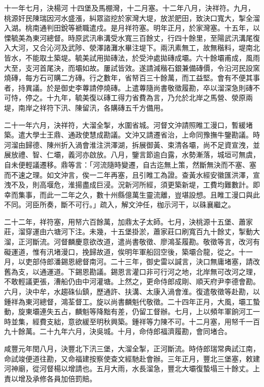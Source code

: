 \begin{pinyinscope}
十一年七月，決楊河十四堡及馬棚灣，十二月塞。十二年八月，決祥符。九月，桃源奸民陳瑞因河水盛漲，糾眾盜挖於家灣大堤，放淤肥田，致決口寬大，掣全溜入湖。桃南通判田銳等褫職遣戍。是月祥符塞。明年正月，於家灣塞。十五年，以慄毓美為東河總督。時原武汛串溝受水寬三百餘丈，行四十餘里，至陽武汛溝尾復入大河，又合沁河及武陟、滎澤諸灘水畢注堤下。兩汛素無工，故無稭料，堤南北皆水，不能取土築堤。毓美試用拋磚法，於受沖處拋磚成壩。六十餘壩甫成，風雨大至，支河首尾決，而壩如故。屢試皆效。遂請減稭石銀兼備磚價，令沿河民設窯燒磚，每方石可購二方磚。行之數年，省帑百三十餘萬，而工益堅。會有不便其事者，持異議。於是御史李蓴請停燒磚。上遣蓴隨尚書敬徵履勘，卒以溜深急則磚不可恃，停之。十九年，毓美復以磚工得力省費為言，乃允於北岸之馬營、滎原兩堤，南岸之祥符下汛、陳留汛，各購磚五千方備用。

二十一年六月，決祥符，大溜全掣，水圍省城。河督文沖請照睢工漫口，暫緩堵築。遣大學士王鼎、通政使慧成勘議。文沖又請遷省治，上命同豫撫牛鑒勘議。時河溜由歸德、陳州折入渦會淮注洪澤湖，拆展御黃、束清各壩，尚不足資宣洩，並展放禮、智、仁壩，義河亦啟放。八月，鑒言節逾白露，水勢漸落，城垣可無虞，自未便輕議遷移。鼎等言：「河流隨時變遷，自古迄無上策，然斷無決而不塞、塞而不速之理。如文沖言，俟一二年再塞，且引睢工為證。查黃水經安徽匯洪澤，宣洩不及，則高堰危，淮揚盡成巨浸。況新河所經，須更築新堤，工費均難數計。即幸而集事，而此一二年之久，數十州縣億萬生靈流離，豈堪設想。且睢工漫口與此不同。河臣所奏，斷不可行。」疏入，解文沖任，枷示河干，以硃襄繼之。

二十二年，祥符塞，用帑六百餘萬，加鼎太子太師。七月，決桃源十五堡、蕭家莊，溜穿運由六塘河下注。未幾，十五堡掛淤，蕭家莊口刷寬百九十餘丈，掣動大溜，正河斷流。河督麟慶意欲改道，遣尚書敬徵、廖鴻荃履勘。敬徵等言，改河有礙運道，惟有汛堵漫口，挽歸故道，俟明年軍船回空後，築壩合龍，從之。十一月，以吏部侍郎潘錫恩總督南河。二十三年，御史雷以諴言，決口無庸堵塞，請改舊為支，以通運道。下錫恩勘議。錫恩言灌口非可行河之地，北岸無可改河之理，不敢輕議更張，漕船仍由中河灌塘。上然之，更命侍郎成剛、順天府尹李德會勘。六月，決中牟，水趨硃仙鎮，歷通許、扶溝、太康入渦會淮。復遣敬徵等赴勘，以鍾祥為東河總督，鴻荃督工。旋以尚書麟魁代敬徵。二十四年正月，大風，壩工蟄動，旋東壩連失五占，麟魁等降黜有差，仍留工督辦。七月，上以頻年軍餉河工一時並集，經費支絀，意欲緩至明秋興築。鍾祥等力陳不可。十二月塞，用帑千一百九十餘萬。二十九年六月，決吳城。十月，命侍郎福濟履勘，會同堵合。

咸豐元年閏八月，決豐北下汛三堡，大溜全掣，正河斷流。時侍郎瑞常典試江南，命試竣便道往勘，又命福建按察使查文經馳赴會辦。三年正月，豐北三堡塞，敕建河神廟，從河督楊以增請也。五月大雨，水長溜急，豐北大壩復蟄塌三十餘丈。上責以增及承修各員加倍罰賠。


\end{pinyinscope}
